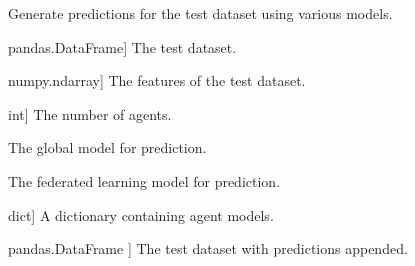 \documentclass[letterpaper,10pt,english]{sphinxmanual}
\begin{document}

\begin{fulllineitems}
\label{\detokenize{utils:utils.create_df_test_pred}}
\pysigstartsignatures
{}
\pysigstopsignatures
\sphinxAtStartPar
Generate predictions for the test dataset using various models.
\begin{description}
\begin{description}
\sphinxlineitem{df\_test}{[}pandas.DataFrame{]}
\sphinxAtStartPar
The test dataset.

\sphinxlineitem{X\_test}{[}numpy.ndarray{]}
\sphinxAtStartPar
The features of the test dataset.

\sphinxlineitem{NUM\_AGENTS}{[}int{]}
\sphinxAtStartPar
The number of agents.

\sphinxAtStartPar
The global model for prediction.

\sphinxAtStartPar
The federated learning model for prediction.

\sphinxlineitem{agent\_model\_dictionary}{[}dict{]}
\sphinxAtStartPar
A dictionary containing agent models.

\end{description}

\begin{description}
\sphinxlineitem{df\_test}{[}pandas.DataFrame {]}
\sphinxAtStartPar
The test dataset with predictions appended.

\end{description}

\end{description}

\end{fulllineitems}

\end{document}
